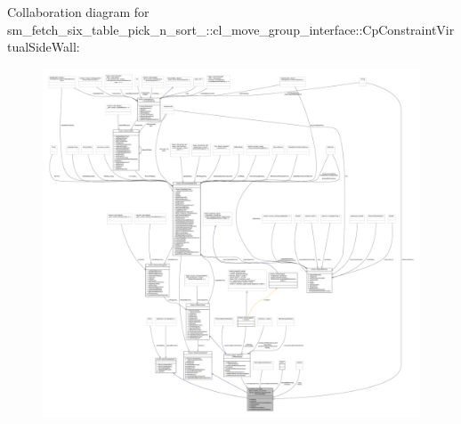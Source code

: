 Collaboration diagram for sm\+\_\+fetch\+\_\+six\+\_\+table\+\_\+pick\+\_\+n\+\_\+sort\+\_\+:\+:cl\+\_\+move\+\_\+group\+\_\+interface\+:\+:Cp\+Constraint\+Virtual\+Side\+Wall\+:
\nopagebreak
\begin{figure}[H]
\begin{center}
\leavevmode
\includegraphics[width=350pt]{classsm__fetch__six__table__pick__n__sort__1_1_1cl__move__group__interface_1_1CpConstraintVirtualSideWall__coll__graph}
\end{center}
\end{figure}
